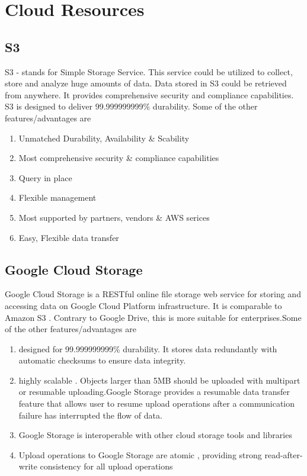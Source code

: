 \documentclass[journal]{hybrid-cloud}
\begin{document}
\appendices
\section{Cloud Resources}

\subsection{S3}

S3 - stands for Simple Storage Service. This service could be utilized to collect, store and analyze huge amounts of data. Data stored in S3 could be retrieved from anywhere. It provides comprehensive security and compliance capabilities. S3 is designed to deliver 99.999999999\% durability. Some of the other features/advantages are \cite{S3documentation}

\begin{enumerate}
	\item Unmatched Durability, Availability \& Scability
	\item Most comprehensive security \& compliance capabilities
	\item Query in place
	\item Flexible management
	\item Most supported by partners, vendors \& AWS serices
	\item Easy, Flexible data transfer
\end{enumerate}

\subsection{Google Cloud Storage}

Google Cloud Storage is a RESTful online file storage web service for storing and accessing data on Google Cloud Platform infrastructure. It is comparable to Amazon S3 . Contrary to Google Drive, this is more suitable for enterprises.Some of the other features/advantages are \cite{googlestorage}

\begin{enumerate}
	\item designed for 99.999999999\% durability. It stores data redundantly with automatic checksums to ensure data integrity.
	\item highly scalable . Objects larger than 5MB should be uploaded with multipart or resumable uploading.Google Storage provides a resumable data transfer feature that allows user to resume upload operations after a communication failure has interrupted the flow of data.
	\item Google Storage is interoperable with other cloud storage tools and libraries
	\item  Upload operations to Google Storage are atomic , providing strong read-after-write consistency for all upload operations
\end{enumerate}
\end{document}

